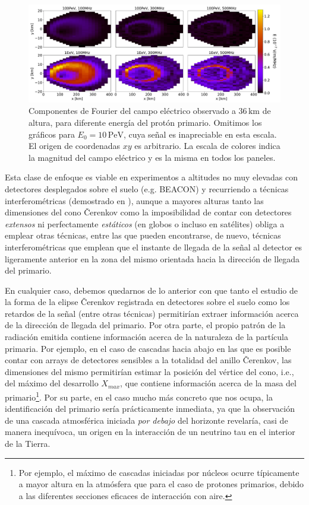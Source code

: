 \documentclass[11 pt, a4paper]{article} %
\numberwithin{equation}{section}
\numberwithin{figure}{section}
\numberwithin{table}{section}
\begin{document}
	\begin{figure}[H]
	\centering
	\includegraphics[width=.95\linewidth]{figures/Radio_UG/85deg_varE}
	\caption{Componentes de Fourier del campo eléctrico observado a $36\,\mathrm{km}$ de altura, para diferente energía del protón primario. Omitimos los gráficos para $E_0=10\,\mathrm{PeV}$, cuya señal es inapreciable en esta escala. El origen de coordenadas $xy$ es arbitrario. La escala de colores indica la magnitud del campo eléctrico y es la misma en todos los paneles.}
	\label{85deg_varE}
\end{figure}
Esta clase de enfoque es viable en experimentos a altitudes no muy elevadas con detectores desplegados sobre el suelo (e.g. BEACON) y recurriendo a técnicas interferométricas (demostrado en \cite{schoorlemmer2021radio}), aunque a mayores alturas tanto las dimensiones del cono \v{C}erenkov como la imposibilidad de contar con detectores \textit{extensos} ni perfectamente \textit{estáticos} (en globos o incluso en satélites) obliga a emplear otras técnicas, entre las que pueden encontrarse, de nuevo, técnicas interferométricas que emplean que el instante de llegada de la señal al detector es ligeramente anterior en la zona del mismo orientada hacia la dirección de llegada del primario.  

En cualquier caso, debemos quedarnos de lo anterior con que tanto el estudio de la forma de la elipse \v{C}erenkov registrada en detectores sobre el suelo como los retardos de la señal (entre otras técnicas) permitirían extraer información acerca de la dirección de llegada del primario. Por otra parte, el propio patrón de la radiación emitida contiene información acerca de la naturaleza de la partícula primaria. Por ejemplo, en el caso de cascadas hacia abajo en las que es posible contar con arrays de detectores sensibles a la totalidad del anillo \v{C}erenkov, las dimensiones del mismo permitirían estimar la posición del vértice del cono, i.e., del máximo del desarrollo $X_{max}$, que contiene información acerca de la masa del primario\footnote{ Por ejemplo, el máximo de cascadas iniciadas por núcleos ocurre típicamente a mayor altura en la atmósfera que para el caso de protones primarios, debido a las diferentes secciones eficaces de interacción con aire.}. Por su parte, en el caso mucho más concreto que nos ocupa, la identificación del primario sería prácticamente inmediata, ya que la observación de una cascada atmosférica iniciada \textit{por debajo} del horizonte revelaría, casi de manera inequívoca, un origen en la interacción de un neutrino tau en el interior de la Tierra.
\end{document}
